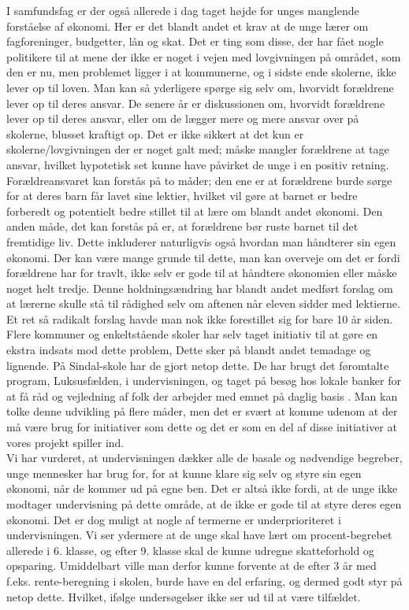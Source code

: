 I samfundsfag er der også allerede i dag taget højde for unges manglende forståelse af økonomi. Her er det blandt andet et krav at de unge lærer om fagforeninger, budgetter, lån og skat. Det er ting som disse, der har fået nogle politikere til at mene der ikke er noget i vejen med lovgivningen på området, som den er nu, men problemet ligger i at kommunerne, og i sidste ende skolerne, ikke lever op til loven\cite{BusinessDK3}. Man kan så yderligere spørge sig selv om, hvorvidt forældrene lever op til deres ansvar. De senere år er diskussionen om, hvorvidt forældrene lever op til deres ansvar, eller om de lægger mere og mere ansvar over på skolerne, blusset kraftigt op. Det er ikke sikkert at det kun er skolerne/lovgivningen der er noget galt med; måske mangler forældrene at tage ansvar, hvilket hypotetisk set kunne have påvirket de unge i en positiv retning. Forældreansvaret kan forstås på to måder; den ene er at forældrene burde sørge for at deres barn får lavet sine lektier, hvilket vil gøre at barnet er bedre forberedt og potentielt bedre stillet til at lære om blandt andet økonomi. Den anden måde, det kan forstås på er, at forældrene bør ruste barnet til det fremtidige liv. Dette inkluderer naturligvis også hvordan man håndterer sin egen økonomi. Der kan være mange grunde til dette, man kan overveje om det er fordi forældrene har for travlt, ikke selv er gode til at håndtere økonomien eller måske noget helt tredje. Denne holdningsændring har blandt andet medført forslag om at lærerne skulle stå til rådighed selv om aftenen når eleven sidder med lektierne. Et ret så radikalt forslag havde man nok ikke forestillet sig for bare 10 år siden\cite{ForaldreAnsvar}.\\

Flere kommuner og enkeltstående skoler har selv taget initiativ til at gøre en ekstra indsats mod dette problem, Dette sker på blandt andet temadage og lignende. På Sindal-skole har de gjort netop dette. De har brugt det føromtalte program, Luksusfælden, i undervisningen, og taget på besøg hos lokale banker for at få råd og vejledning af folk der arbejder med emnet på daglig basis \cite{Sindal}. Man kan tolke denne udvikling på flere måder, men det er svært at komme udenom at der må være brug for initiativer som dette og det er som en del af disse initiativer at vores projekt spiller ind.\\

Vi har vurderet, at undervisningen dækker alle de basale og nødvendige begreber, unge mennesker har brug for, for at kunne klare sig selv og styre sin egen økonomi, når de kommer ud på egne ben. Det er altså ikke fordi, at de unge ikke modtager undervisning på dette område, at de ikke er gode til at styre deres egen økonomi. Det er dog muligt at nogle af termerne er underprioriteret i undervisningen. Vi ser ydermere at de unge skal have lært om procent-begrebet allerede i 6. klasse, og efter 9. klasse skal de kunne udregne skatteforhold og opsparing. Umiddelbart ville man derfor kunne forvente at de efter 3 år med f.eks. rente-beregning i skolen, burde have en del erfaring, og dermed godt styr på netop dette. Hvilket, ifølge undersøgelser ikke ser ud til at være tilfældet.